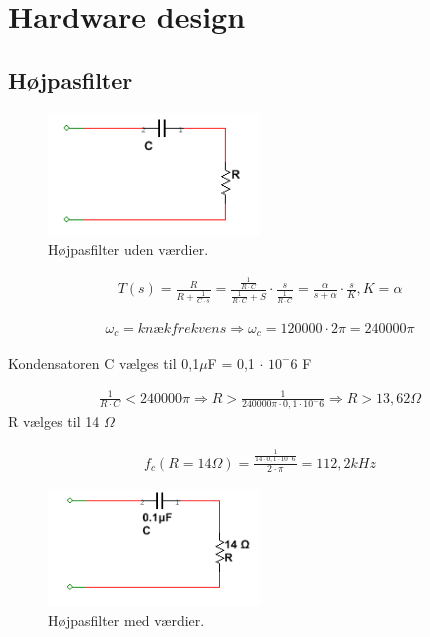 \chapter{Hardware design}
\section{Højpasfilter}

\begin{figure}[htbp]
	\centering
	\includegraphics[width=0.50\textwidth]{billeder/HWdesign/HP_UV.png}
	\caption{Højpasfilter uden værdier.}
	\label{fig:HP_UV}
\end{figure}


\begin{align}
\label{eq: HP_networkfunction}T(s) = \frac{R}{R+\frac{1}{C \cdot s}} = \frac{\frac{1}{R \cdot C}}{\frac{1}{R \cdot C}+S} \cdot \frac{s}{\frac{1}{R \cdot C}} = \frac{\alpha}{s + \alpha} \cdot \frac{s}{K}         , K= \alpha
\end{align}

\begin{align}
	\omega_c = knækfrekvens \Rightarrow \omega_c = 120000 \cdot 2 \pi = 240000\pi 
\end{align} 

	Kondensatoren C vælges til 0,1$\mu$F  = 0,1 $\cdot$  $10^-6$ F

\begin{align}
	\frac{1}{R \cdot C} < 240000\pi \Rightarrow R > \frac{1}{240000\pi \cdot 0,1 \cdot 10^-6}
	\Rightarrow R > 13,62 \Omega
\end{align}
	R vælges til 14 $\Omega$

\begin{align}
	f_c (R=14\Omega) = \frac{\frac{1}{14 \cdot 0,1 \cdot 10^-6}}{2 \cdot \pi} =112,2kHz
\end{align}

\begin{figure}[htbp]
	\centering
	\includegraphics[width=0.50\textwidth]{billeder/HWdesign/HP_MV.png}
	\caption{Højpasfilter med værdier.}
	\label{fig:HP_MV}
\end{figure}

